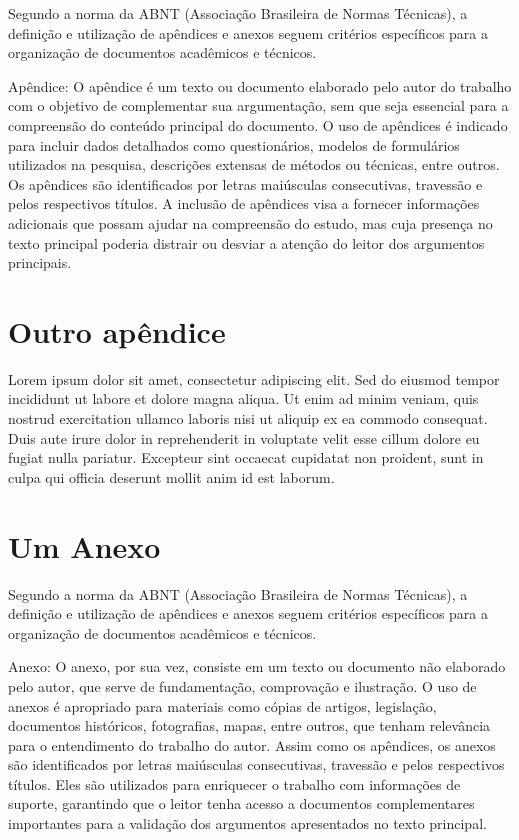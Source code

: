 \documentclass[dsc,setavermelha,numeracaoporcapitulo,linhanafolhaderosto]{ufrj}
\theoremstyle{plain}
\theoremstyle{definition}
\theoremstyle{remark}
\begin{document}
Segundo a norma da ABNT (Associação Brasileira de Normas Técnicas), a definição e utilização de apêndices e anexos seguem critérios específicos para a organização de documentos acadêmicos e técnicos.

Apêndice: O apêndice é um texto ou documento elaborado pelo autor do trabalho com o objetivo de complementar sua argumentação, sem que seja essencial para a compreensão do conteúdo principal do documento. O uso de apêndices é indicado para incluir dados detalhados como questionários, modelos de formulários utilizados na pesquisa, descrições extensas de métodos ou técnicas, entre outros. Os apêndices são identificados por letras maiúsculas consecutivas, travessão e pelos respectivos títulos. A inclusão de apêndices visa a fornecer informações adicionais que possam ajudar na compreensão do estudo, mas cuja presença no texto principal poderia distrair ou desviar a atenção do leitor dos argumentos principais.

\chapter{Outro apêndice}

Lorem ipsum dolor sit amet, consectetur adipiscing elit. Sed do eiusmod tempor incididunt ut labore et dolore magna aliqua. Ut enim ad minim veniam, quis nostrud exercitation ullamco laboris nisi ut aliquip ex ea commodo consequat. Duis aute irure dolor in reprehenderit in voluptate velit esse cillum dolore eu fugiat nulla pariatur. Excepteur sint occaecat cupidatat non proident, sunt in culpa qui officia deserunt mollit anim id est laborum.

\annex

\chapter{Um Anexo}
Segundo a norma da ABNT (Associação Brasileira de Normas Técnicas), a definição e utilização de apêndices e anexos seguem critérios específicos para a organização de documentos acadêmicos e técnicos.

Anexo: O anexo, por sua vez, consiste em um texto ou documento não elaborado pelo autor, que serve de fundamentação, comprovação e ilustração. O uso de anexos é apropriado para materiais como cópias de artigos, legislação, documentos históricos, fotografias, mapas, entre outros, que tenham relevância para o entendimento do trabalho do autor. Assim como os apêndices, os anexos são identificados por letras maiúsculas consecutivas, travessão e pelos respectivos títulos. Eles são utilizados para enriquecer o trabalho com informações de suporte, garantindo que o leitor tenha acesso a documentos complementares importantes para a validação dos argumentos apresentados no texto principal.
\end{document}
